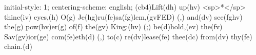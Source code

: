 initial-style: 1;
centering-scheme: english;
(cb4)Lift(dh) up(hv) <sp>*</sp> thine(iv) eyes,(h) O(g) Je(hg)ru(fe)sa(fg)lem,(gvFED) (,) and(dv) see(fghv) the(g) pow(hv)er(g) of(f) the(gv) King:(hv) (;) be(d)hold,(ev) the(fv) Sav(gv)ior(ge) com(fe)eth(d) (,) to(c) re(dv)lease(fe) thee(dc) from(dv) thy(fe) chain.(d)